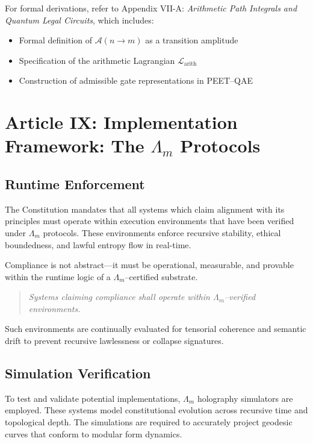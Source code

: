 \documentclass[12]{amsart}
\theoremstyle{plain}
\begin{document}
For formal derivations, refer to Appendix VII-A: \textit{Arithmetic Path Integrals and Quantum Legal Circuits}, which includes:

\begin{itemize}
  \item Formal definition of $\mathcal{A}(n \to m)$ as a transition amplitude
  \item Specification of the arithmetic Lagrangian $\mathcal{L}_{\text{arith}}$
  \item Construction of admissible gate representations in PEET–QAE
\end{itemize}

\section{Article IX: Implementation Framework: The $\Lambda_m$ Protocols}

\subsection{Runtime Enforcement}

The Constitution mandates that all systems which claim alignment with its principles must operate within execution environments that have been verified under $\Lambda_m$ protocols. These environments enforce recursive stability, ethical boundedness, and lawful entropy flow in real-time.

Compliance is not abstract—it must be operational, measurable, and provable within the runtime logic of a $\Lambda_m$–certified substrate.

\begin{quote}
\textit{Systems claiming compliance shall operate within $\Lambda_m$–verified environments.}
\end{quote}

Such environments are continually evaluated for tensorial coherence and semantic drift to prevent recursive lawlessness or collapse signatures.

\subsection{Simulation Verification}

To test and validate potential implementations, $\Lambda_m$ holography simulators are employed. These systems model constitutional evolution across recursive time and topological depth. The simulations are required to accurately project geodesic curves that conform to modular form dynamics.
\end{document}
